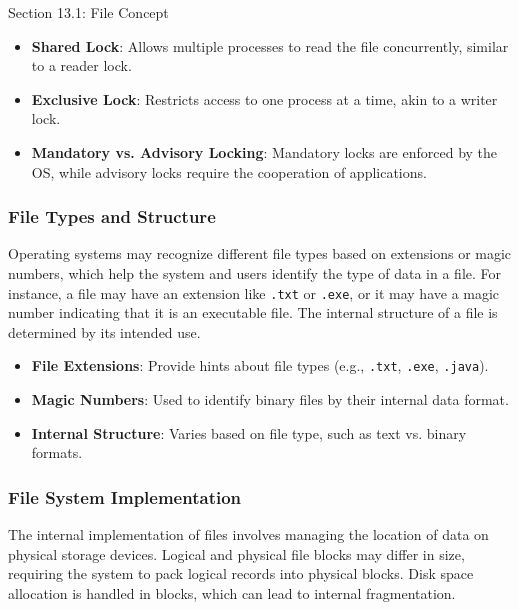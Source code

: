 \begin{notes}{Section 13.1: File Concept}
\begin{highlight}
        \begin{itemize}
            \item \textbf{Shared Lock}: Allows multiple processes to read the file concurrently, similar to a reader lock.
            \item \textbf{Exclusive Lock}: Restricts access to one process at a time, akin to a writer lock.
            \item \textbf{Mandatory vs. Advisory Locking}: Mandatory locks are enforced by the OS, while advisory locks require the cooperation of applications.
        \end{itemize}
    
    \end{highlight}
    
    \subsubsection*{File Types and Structure}
    
    Operating systems may recognize different file types based on extensions or magic numbers, which help the system and users identify the type of data in a file. For instance, a file may have an extension 
    like \texttt{.txt} or \texttt{.exe}, or it may have a magic number indicating that it is an executable file. The internal structure of a file is determined by its intended use.
    
    \begin{highlight}
    
        \begin{itemize}
            \item \textbf{File Extensions}: Provide hints about file types (e.g., \texttt{.txt}, \texttt{.exe}, \texttt{.java}).
            \item \textbf{Magic Numbers}: Used to identify binary files by their internal data format.
            \item \textbf{Internal Structure}: Varies based on file type, such as text vs. binary formats.
        \end{itemize}
    
    \end{highlight}
    
    \subsubsection*{File System Implementation}
    
    The internal implementation of files involves managing the location of data on physical storage devices. Logical and physical file blocks may differ in size, requiring the system to pack logical records 
    into physical blocks. Disk space allocation is handled in blocks, which can lead to internal fragmentation.
    

\end{notes}

